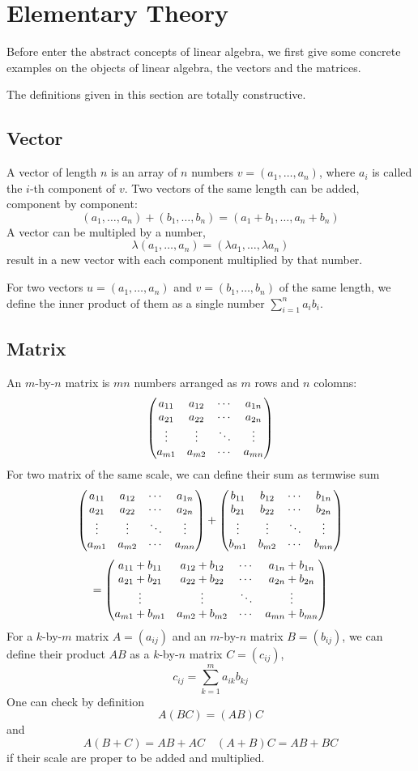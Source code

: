 \section{Elementary Theory}
Before enter the abstract concepts of linear algebra,
we first give some concrete examples on the objects of linear algebra,
the vectors and the matrices.

The definitions given in this section are totally constructive.

\subsection{Vector}
A vector of length $n$ is an array of $n$ numbers $v = (a_1, \dots, a_n)$,
where $a_i$ is called the $i$-th component of $v$.
Two vectors of the same length can be added, component by component:
$$(a_1, \dots, a_n) + (b_1, \dots, b_n) = (a_1 + b_1, \dots, a_n + b_n)$$
A vector can be multipled by a number,
$$\lambda(a_1, \dots, a_n) = (\lambda a_1, \dots, \lambda a_n)$$
result in a new vector with each component multiplied by that number.

For two vectors $u = (a_1,\dots, a_n)$ and $v = (b_1,\dots, b_n)$ of the same length,
we define the inner product of them as a single number $\sum_{i=1}^n a_ib_i$.

\subsection{Matrix}
An $m$-by-$n$ matrix is $mn$ numbers arranged as $m$ rows and $n$ colomns:
$$\left(\begin{matrix}
a_{11} & a_{12} & \cdots & a_{1n} \cr
a_{21} & a_{22} & \cdots & a_{2n} \cr
\vdots & \vdots & \ddots & \vdots \cr
a_{m1} & a_{m2} & \cdots & a_{mn}
\end{matrix}\right)$$
For two matrix of the same scale, we can define their sum as termwise sum
$$\left(\begin{matrix}
a_{11} & a_{12} & \cdots & a_{1n} \cr
a_{21} & a_{22} & \cdots & a_{2n} \cr
\vdots & \vdots & \ddots & \vdots \cr
a_{m1} & a_{m2} & \cdots & a_{mn}
\end{matrix}\right) +
\left(\begin{matrix}
b_{11} & b_{12} & \cdots & b_{1n} \cr
b_{21} & b_{22} & \cdots & b_{2n} \cr
\vdots & \vdots & \ddots & \vdots \cr
b_{m1} & b_{m2} & \cdots & b_{mn}
\end{matrix}\right)$$
$$=\left(\begin{matrix}
a_{11} + b_{11} & a_{12} + b_{12} & \cdots & a_{1n} + b_{1n} \cr
a_{21} + b_{21} & a_{22} + b_{22} & \cdots & a_{2n} + b_{2n} \cr
\vdots & \vdots & \ddots & \vdots \cr
a_{m1} + b_{m1} & a_{m2} + b_{m2} & \cdots & a_{mn} + b_{mn}
\end{matrix}\right)
$$
For a $k$-by-$m$ matrix $A = (a_{ij})$ and an $m$-by-$n$ matrix $B = (b_{ij})$,
we can define their product $AB$ as a $k$-by-$n$ matrix $C = (c_{ij})$,
$$c_{ij} = \sum_{k=1}^m a_{ik}b_{kj}$$
One can check by definition $$A(BC) = (AB)C$$
and $$A(B + C) = AB + AC \quad (A + B)C = AB + BC$$
if their scale are proper to be added and multiplied.

